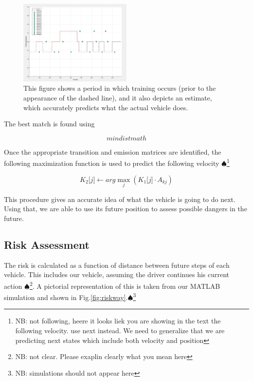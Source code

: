 \documentclass[conference]{IEEEtran}
\newcommand\NB[1]{$\spadesuit$\footnote{NB: #1}}
\begin{document}
\begin{figure}[ht]
    \includegraphics[width=0.5\textwidth]{trainset.JPG}
    \caption{This figure shows a period in which training occurs (prior to the appearance of the dashed line), and it also depicts an estimate, which accurately predicts what the actual vehicle does.}
    \label{fig:trainset}
\end{figure}


The best match is found using

\begin{equation}
    min dist math
\end{equation}

Once the appropriate transition and emission matrices are identified, the following maximization function is used to predict the following velocity \NB{not following, heere it looks liek you are showing in the text the following velocity. use next instead. We need to generalize that we are predicting next states which include both velocity and position}

\begin{equation}
     K_{2}\lbrack j \rbrack \gets arg \max\limits_{j}(K_{1} \lbrack j \rbrack \cdot A_{kj})
\end{equation}

This procedure gives an accurate idea of what the vehicle is going to do next. Using that, we are able to use its future position to assess possible dangers in the future.

\subsection{Risk Assessment}

The risk is calculated as a function of distance between future steps of each vehicle. This includes our vehicle, assuming the driver continues his current action \NB{not clear. Please exaplin clearly what you mean here}. A pictorial representation of this is taken from our MATLAB simulation and shown in Fig.\ref{fig:riskway}.\NB{simulations should not appear here}
\end{document}
